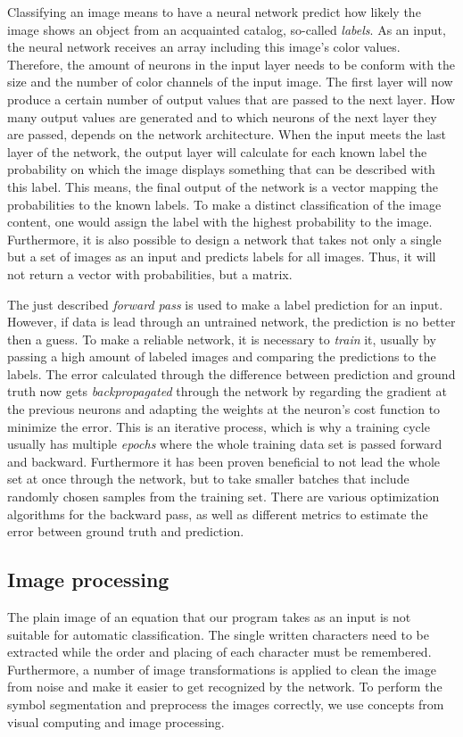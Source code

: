 \documentclass[12pt]{article}
\begin{document}
	Classifying an image means to have a neural network predict how likely the image shows an object from an acquainted catalog, so-called \textit{labels}. As an input, the neural network receives an array including this image's color values. Therefore, the amount of neurons in the input layer needs to be conform with the size and the number of color channels of the input image. The first layer will now produce a certain number of output values that are passed to the next layer. How many output values are generated and to which neurons of the next layer they are passed, depends on the network architecture. When the input meets the last layer of the network, the output layer will calculate for each known label the probability on which the image displays something that can be described with this label. This means, the final output of the network is a vector mapping the probabilities to the known labels. To make a distinct classification of the image content, one would assign the label with the highest probability to the image. Furthermore, it is also possible to design a network that takes not only a single but a set of images as an input and predicts labels for all images. Thus, it will not return a vector with probabilities, but a matrix.
	
	The just described \textit{forward pass} is used to make a label prediction for an input. However, if data is lead through an untrained network, the prediction is no better then a guess. To make a reliable network, it is necessary to \textit{train} it, usually by passing a high amount of labeled images and comparing the predictions to the labels. The error calculated through the difference between prediction and ground truth now gets \textit{backpropagated} through the network by regarding the gradient at the previous neurons and adapting the weights at the neuron's cost function to minimize the error. This is an iterative process, which is why a training cycle usually has multiple \textit{epochs} where the whole training data set is passed forward and backward. Furthermore it has been proven beneficial to not lead the whole set at once through the network, but to take smaller batches that include randomly chosen samples from the training set. There are various optimization algorithms for the backward pass, as well as different metrics to estimate the error between ground truth and prediction.

	\subsection{Image processing}
	The plain image of an equation that our program takes as an input is not suitable for automatic classification. The single written characters need to be extracted while the order and placing of each character must be remembered. Furthermore, a number of image transformations is applied to clean the image from noise and make it easier to get recognized by the network. To perform the symbol segmentation and preprocess the images correctly, we use concepts from visual computing and image processing.	
	
\end{document}
